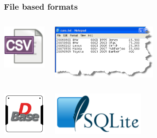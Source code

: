 \documentclass{beamer}
\begin{document}
\begin{frame}
  \frametitle{File based formats}

  \begin{columns}[c]
    \begin{center}
      \includegraphics[height=6em]{csv_text.png}
    \end{center}
    \begin{center}
      \includegraphics[height=7.5em]{fixedwidthfile.png}
    \end{center}
  \end{columns}
  \vfill

  \begin{columns}[c]
    \begin{center}
      \includegraphics[height=6em]{dBase.png}
    \end{center}
    \begin{center}
      \includegraphics[height=6em]{SQLite.png}
    \end{center}
  \end{columns}
\end{frame}
\end{document}
